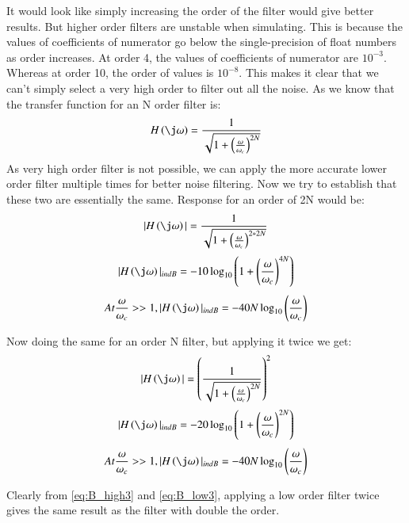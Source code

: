 \documentclass[journal,12pt,twocolumn]{IEEEtran}
\begin{document}
It would look like simply increasing the order of the filter would give better results. But higher order filters are unstable when simulating. This is because the values of coefficients of numerator go below the single-precision of float numbers as order increases. At order 4, the values of coefficients of numerator are $10^{-3}$. Whereas at order 10, the order of values is $10^{-8}$. This makes it clear that we can't simply select a very high order to filter out all the noise. As we know that the transfer function for an N order filter is:
\begin{align}
\label{eq:Butterworth}
    H\brak{\j\omega} = \frac{1}{\sqrt{1+\brak{\frac{\omega}{\omega_{c}}}^{2N}}}
\end{align} 
As very high order filter is not possible, we can apply the more accurate lower order filter multiple times for better noise filtering. Now we try to establish that these two are essentially the same. Response for an order of 2N would be:
\begin{align}
\label{eq:B_high}
    |H\brak{\j\omega}| = \frac{1}{\sqrt{1+\brak{\frac{\omega}{\omega_{c}}}^{2*2N}}}
\end{align} 
\begin{align}
\label{eq:B_high2}
   |H\brak{\j\omega}|_{in dB} = -10\log_{10}\brak{1+\brak{\frac{\omega}{\omega_{c}}}^{4N}}
\end{align} 
\begin{align}
\label{eq:B_high3}
    At \frac{\omega}{\omega_{c}}>>1, |H\brak{\j\omega}|_{in dB} = -40N\log_{10}\brak{\frac{\omega}{\omega_{c}}}
\end{align} 

Now doing the same for an order N filter, but applying it twice we get:
\begin{align}
\label{eq:B_low}
    |H\brak{\j\omega}| = \brak{\frac{1}{\sqrt{1+\brak{\frac{\omega}{\omega_{c}}}^{2N}}}}^2
\end{align} 
\begin{align}
\label{eq:B_low2}
   |H\brak{\j\omega}|_{in dB} = -20\log_{10}\brak{1+\brak{\frac{\omega}{\omega_{c}}}^{2N}}
\end{align} 
\begin{align}
\label{eq:B_low3}
    At \frac{\omega}{\omega_{c}}>>1, |H\brak{\j\omega}|_{in dB} = -40N\log_{10}\brak{\frac{\omega}{\omega_{c}}}
\end{align} 

Clearly from \ref{eq:B_high3} and \ref{eq:B_low3}, applying a low order filter twice gives the same result as the filter with double the order.
\end{document}
